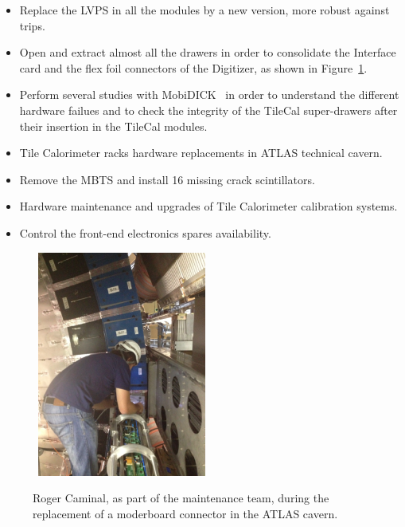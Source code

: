 \begin{itemize}
\item Replace the LVPS in all the modules by a new version, more robust against trips.
\item Open and extract almost all the drawers in order to consolidate the Interface card and the flex foil connectors of the Digitizer, as shown in Figure~\ref{fig:DetectorWork_PictureATLASCavern}.
\item Perform several studies with MobiDICK~\cite{Calvet:2008zz} in order to understand the different hardware failues and to check the integrity of the TileCal super-drawers after their insertion in the TileCal modules.
\item Tile Calorimeter racks hardware replacements in ATLAS technical cavern.
\item Remove the MBTS and install 16 missing crack scintillators.
\item Hardware maintenance and upgrades of Tile Calorimeter calibration systems.
\item Control the front-end electronics spares availability.
\end{itemize}

\begin{figure}[!ht]
\begin{center}
\mbox{
  \includegraphics[width=0.495\textwidth]{Appendix_DetectorWork/Figures/PhotoATLASCavern.eps}
}
\end{center}
\caption{Roger Caminal, as part of the maintenance team, during the replacement of a moderboard connector in the ATLAS cavern.}
\label{fig:DetectorWork_PictureATLASCavern}
\end{figure}
